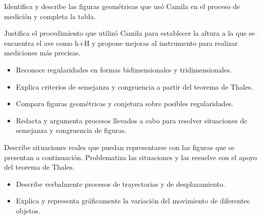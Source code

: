 
Identifica y describe las figuras geométricas que usó Camila en el proceso de medición y completa la tabla.


Justifica el procedimiento que utilizó Camila para establecer la altura a la que se encuentra el ave como h+H y propone mejoras al instrumento para realizar mediciones más precisas.


\evidencias

\begin{itemize}
  \item Reconoce regularidades en formas bidimensionales y tridimensionales.
  \item Explica criterios de semejanza y congruencia a partir del teorema de Thales.
  \item Compara figuras geométricas y conjetura sobre posibles regularidades.
  \item Redacta y argumenta procesos llevados a cabo para resolver situaciones de semejanza y congruencia de figuras.
\end{itemize}

\ejemplo

Describe situaciones reales que puedan representarse con las figuras que se presentan a continuación. Problematiza las situaciones y las resuelve con el apoyo del teorema de Thales.



\evidencias

\begin{itemize}
  \item Describe verbalmente procesos de trayectorias y de desplazamiento.
  \item Explica y representa gráficamente la variación del movimiento de diferentes objetos.
\end{itemize}


